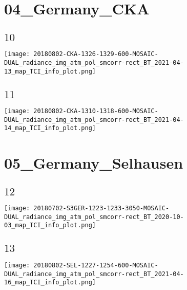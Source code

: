 \documentclass[9pt]{beamer}
\begin{document}
\section{04\_Germany\_CKA}

\subsection{$10$}
\begin{frame}
\begin{center}
\texttt{[image: 20180802-CKA-1326-1329-600-MOSAIC-DUAL\_radiance\_img\_atm\_pol\_smcorr-rect\_BT\_2021-04-13\_map\_TCI\_info\_plot.png]}
\end{center}
\end{frame}

\subsection{$11$}
\begin{frame}
\begin{center}
\texttt{[image: 20180802-CKA-1310-1318-600-MOSAIC-DUAL\_radiance\_img\_atm\_pol\_smcorr-rect\_BT\_2021-04-14\_map\_TCI\_info\_plot.png]}
\end{center}
\end{frame}
\section{05\_Germany\_Selhausen}

\subsection{$12$}
\begin{frame}
\begin{center}
\texttt{[image: 20180702-S3GER-1223-1233-3050-MOSAIC-DUAL\_radiance\_img\_atm\_pol\_smcorr-rect\_BT\_2020-10-03\_map\_TCI\_info\_plot.png]}
\end{center}
\end{frame}

\subsection{$13$}
\begin{frame}
\begin{center}
\texttt{[image: 20180802-SEL-1227-1254-600-MOSAIC-DUAL\_radiance\_img\_atm\_pol\_smcorr-rect\_BT\_2021-04-16\_map\_TCI\_info\_plot.png]}
\end{center}
\end{frame}
\end{document}
